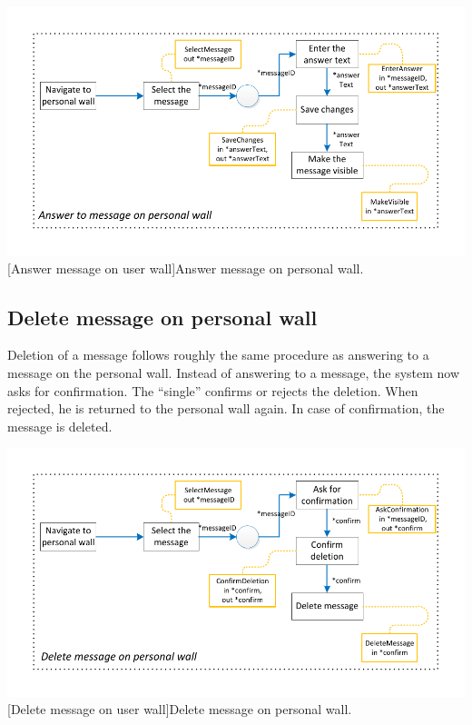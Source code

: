 \documentclass[11pt, a4paper,svglistings,oneside]{book}
\begin{document}
$\;$ \\
\noindent\begin{minipage}{\textwidth}
    \centering
   \includegraphics[scale=1]{nav_AnswerMessagePersonalWall.pdf}
 [Answer message on user wall]{Answer message on personal wall.}
\end{minipage}

\subsection{Delete message on personal wall}

Deletion of a message follows roughly the same procedure as answering to a message on the personal wall. Instead of answering to a message, the system now asks for confirmation. The ``single'' confirms or rejects the deletion. When rejected, he is returned to the personal wall again. In case of confirmation, the message is deleted.
$\;$ \\
\noindent\begin{minipage}{\textwidth}
    \centering
   \includegraphics[scale=1]{nav_DeleteMessageOnWall.pdf}
 [Delete message on user wall]{Delete message on personal wall.}
\end{minipage}
$\;$ \\ 
\end{document}
